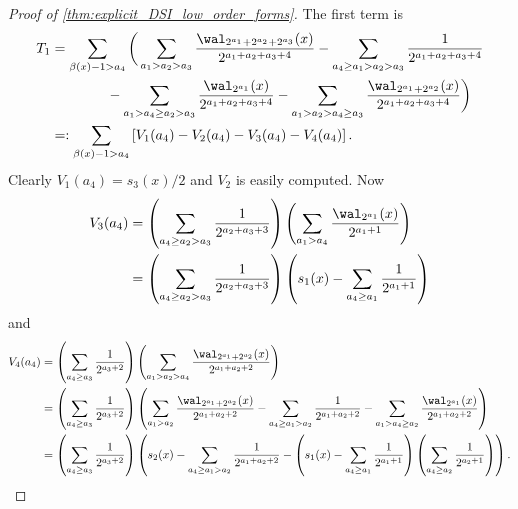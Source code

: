 \documentclass[acmsmall]{acmart}
\begin{document}
\begin{proof}[Proof of \cref{thm:explicit_DSI_low_order_forms}]
    The first term is 
    \begin{align*}
        T_1 &= \sum_{\beta(x)-1 > a_4} \bigg(\sum_{a_1>a_2>a_3} \frac{\wal_{2^{a_1}+2^{a_2}+2^{a_3}}(x)}{2^{a_1+a_2+a_3+4}} -  \sum_{a_4  \geq a_1>a_2>a_3} \frac{1}{2^{a_1+a_2+a_3+4}} \\ & \qquad\qquad  - \sum_{a_1 > a_4 \geq a_2 > a_3} \frac{\wal_{2^{a_1}}(x)}{2^{a_1+a_2+a_3+4}} - \sum_{a_1 > a_2 > a_4 \geq a_3} \frac{\wal_{2^{a_1}+2^{a_2}}(x)}{2^{a_1+a_2+a_3+4}} 
        \bigg) \\
        &=: \sum_{\beta(x)-1 > a_4} \left[V_1(a_4)-V_2(a_4) - V_3(a_4) - V_4(a_4) \right].
    \end{align*}
    Clearly $V_1(a_4) = s_3(x)/2$ and $V_2$ is easily computed. Now
    \begin{align*}
        V_3(a_4) &= \left(\sum_{a_4 \geq a_2 > a_3} \frac{1}{2^{a_2+a_3+3}}\right)\left(\sum_{a_1>a_4} \frac{\wal_{2^{a_1}}(x)}{2^{a_1+1}}\right) \\
        &= \left(\sum_{a_4 \geq a_2 > a_3} \frac{1}{2^{a_2+a_3+3}}\right)\left(s_1(x) - \sum_{a_4 \geq a_1} \frac{1}{2^{a_1+1}} \right)
    \end{align*}
    and 
    \begin{align*}
        V_4(a_4) & = \left(\sum_{a_4 \geq a_3} \frac{1}{2^{a_3+2}}\right)\left(\sum_{a_1>a_2 > a_4} \frac{\wal_{2^{a_1}+2^{a_2}}(x)}{2^{a_1+a_2+2}}\right) \\
        &= \left(\sum_{a_4 \geq a_3} \frac{1}{2^{a_3+2}}\right)\left(\sum_{a_1>a_2} \frac{\wal_{2^{a_1}+2^{a_2}}(x)}{2^{a_1+a_2+2}} - \sum_{a_4 \geq a_1 > a_2} \frac{1}{2^{a_1+a_2+2}} - \sum_{a_1 > a_4 \geq a_2} \frac{\wal_{2^{a_1}}(x)}{2^{a_1+a_2+2}}\right) \\
        &= \left(\sum_{a_4 \geq a_3} \frac{1}{2^{a_3+2}}\right)\left(s_2(x) - \sum_{a_4 \geq a_1 > a_2} \frac{1}{2^{a_1+a_2+2}} - \left(s_1(x) - \sum_{a_4 \geq a_1} \frac{1}{2^{a_1+1}} \right)\left(\sum_{a_4 \geq a_2} \frac{1}{2^{a_2+1}}\right)\right).
    \end{align*}
    

\end{proof}
\end{document}
